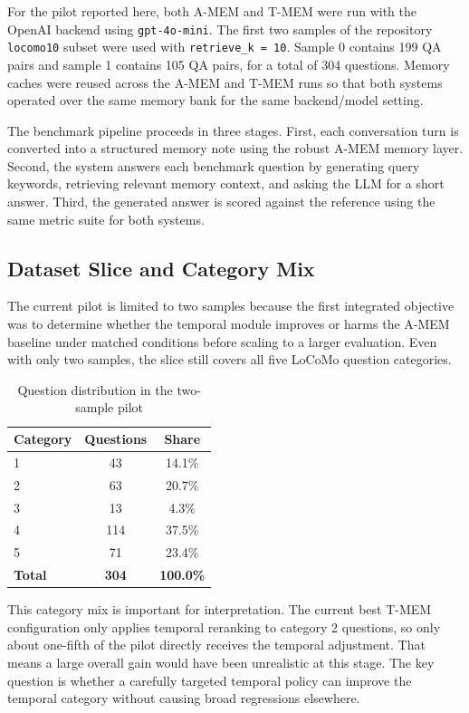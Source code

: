 \documentclass[conference]{IEEEtran}
\begin{document}
For the pilot reported here, both A-MEM and T-MEM were run with the OpenAI backend using \texttt{gpt-4o-mini}. The first two samples of the repository \texttt{locomo10} subset were used with \texttt{retrieve\_k = 10}. Sample 0 contains 199 QA pairs and sample 1 contains 105 QA pairs, for a total of 304 questions. Memory caches were reused across the A-MEM and T-MEM runs so that both systems operated over the same memory bank for the same backend/model setting.

The benchmark pipeline proceeds in three stages. First, each conversation turn is converted into a structured memory note using the robust A-MEM memory layer. Second, the system answers each benchmark question by generating query keywords, retrieving relevant memory context, and asking the LLM for a short answer. Third, the generated answer is scored against the reference using the same metric suite for both systems.

\subsection{Dataset Slice and Category Mix}

The current pilot is limited to two samples because the first integrated objective was to determine whether the temporal module improves or harms the A-MEM baseline under matched conditions before scaling to a larger evaluation. Even with only two samples, the slice still covers all five LoCoMo question categories.

\begin{table}[htbp]
\caption{Question distribution in the two-sample pilot}
\label{tab:distribution}
\centering
\small
\begin{tabular}{lcc}
\toprule
\textbf{Category} & \textbf{Questions} & \textbf{Share} \\
\midrule
1 & 43  & 14.1\% \\
2 & 63  & 20.7\% \\
3 & 13  & 4.3\% \\
4 & 114 & 37.5\% \\
5 & 71  & 23.4\% \\
\midrule
\textbf{Total} & \textbf{304} & \textbf{100.0\%} \\
\bottomrule
\end{tabular}
\end{table}

This category mix is important for interpretation. The current best T-MEM configuration only applies temporal reranking to category 2 questions, so only about one-fifth of the pilot directly receives the temporal adjustment. That means a large overall gain would have been unrealistic at this stage. The key question is whether a carefully targeted temporal policy can improve the temporal category without causing broad regressions elsewhere.
\end{document}
